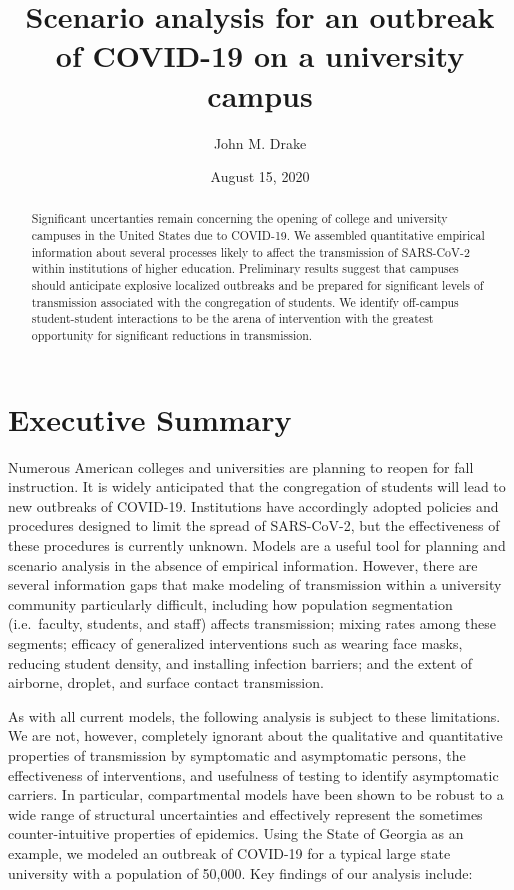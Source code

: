 \documentclass[
]{article}
\title{Scenario analysis for an outbreak of COVID-19 on a university campus}
\author{John M. Drake}
\date{August 15, 2020}
\begin{document}
\maketitle
\begin{abstract}
Significant uncertanties remain concerning the opening of college and
university campuses in the United States due to COVID-19. We assembled
quantitative empirical information about several processes likely to
affect the transmission of SARS-CoV-2 within institutions of higher
education. Preliminary results suggest that campuses should anticipate
explosive localized outbreaks and be prepared for significant levels of
transmission associated with the congregation of students. We identify
off-campus student-student interactions to be the arena of intervention
with the greatest opportunity for significant reductions in
transmission.
\end{abstract}

\hypertarget{executive-summary}{%
\section{Executive Summary}\label{executive-summary}}

Numerous American colleges and universities are planning to reopen for
fall instruction. It is widely anticipated that the congregation of
students will lead to new outbreaks of COVID-19. Institutions have
accordingly adopted policies and procedures designed to limit the spread
of SARS-CoV-2, but the effectiveness of these procedures is currently
unknown. Models are a useful tool for planning and scenario analysis in
the absence of empirical information. However, there are several
information gaps that make modeling of transmission within a university
community particularly difficult, including how population segmentation
(i.e.~faculty, students, and staff) affects transmission; mixing rates
among these segments; efficacy of generalized interventions such as
wearing face masks, reducing student density, and installing infection
barriers; and the extent of airborne, droplet, and surface contact
transmission.

As with all current models, the following analysis is subject to these
limitations. We are not, however, completely ignorant about the
qualitative and quantitative properties of transmission by symptomatic
and asymptomatic persons, the effectiveness of interventions, and
usefulness of testing to identify asymptomatic carriers. In particular,
compartmental models have been shown to be robust to a wide range of
structural uncertainties and effectively represent the sometimes
counter-intuitive properties of epidemics. Using the State of Georgia as
an example, we modeled an outbreak of COVID-19 for a typical large state
university with a population of 50,000. Key findings of our analysis
include:
\end{document}
